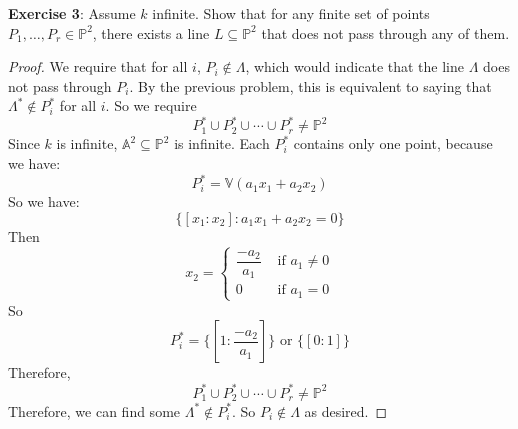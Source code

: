 \documentclass{article}
\begin{document}
\textbf{Exercise 3}: Assume $k$ infinite. Show that for any finite set of points $P_{1}, \ldots, P_{r} \in \mathbb{P}^{2}$, there exists a line $L \subseteq \mathbb{P}^{2}$ that does not pass through any of them.
    \begin{proof}
        We require that for all $i$, $P_{i} \notin \Lambda$, which would indicate that the line $\Lambda$ does not pass through $P_{i}$. By the previous problem, this is equivalent to saying that $\Lambda^{*} \notin P^{*}_{i}$ for all $i$. So we require 
            \begin{equation*}
                P_{1}^{*}  \cup P_{2}^{*} \cup \cdots \cup P_{r}^{*} \neq \mathbb{P}^{2}
            \end{equation*}
        Since $k$ is infinite, $\mathbb{A}^{2} \subseteq \mathbb{P}^{2}$ is infinite. Each $P^{*}_{i}$ contains only one point, because we have:
            \begin{equation*}
                P_{i}^{*} = \mathbb{V}(a_{1}x_{1} + a_{2}x_{2})
            \end{equation*}
        So we have:
            \begin{equation*}
                \{[x_{1} : x_{2}] : a_{1}x_{1} + a_{2}x_{2} = 0\}
            \end{equation*}
        Then 
            \begin{equation*}
                x_{2} = \begin{cases}
                    \dfrac{-a_{2}}{a_{1}} &\text{ if } a_{1} \neq 0 \\
                    0 &\text{ if } a_{1} = 0               
                \end{cases}
            \end{equation*}
        So 
            \begin{equation*}
                P_{i}^{*} = \{[1 : \dfrac{-a_{2}}{a_{1}}]\} \text{ or } \{[0 : 1]\}
            \end{equation*}
        Therefore, 
            \begin{equation*}
                P_{1}^{*}  \cup P_{2}^{*} \cup \cdots \cup P_{r}^{*} \neq \mathbb{P}^{2}
            \end{equation*}
        Therefore, we can find some $\Lambda^{*} \notin P_{i}^{*}$. So $P_{i} \notin \Lambda$ as desired.
    \end{proof}
\end{document}
